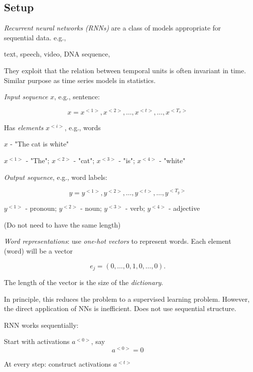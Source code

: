 \documentclass[english]{article}
\begin{document}
\subsection{Setup}
\benum
\item \emph{Recurrent neural networks (RNNs)} are a class of models appropriate for sequential data. e.g., 

text, speech, video, DNA sequence, 

They exploit that the relation between temporal units is often invariant in time. Similar purpose as time series models in statistics. 

\item 

\emph{Input sequence} $x$, e.g., sentence:  

$$x = x^{<1>}, x^{<2>}, \ldots, x^{<t>}, \ldots, x^{<T_x>}$$

Has \emph{elements} $x^{<i>}$, e.g., words

\benum 
\item 
$x$ - "The cat is white"
\item  $x^{<1>}$ - "The"; $x^{<2>}$ - "cat"; $x^{<3>}$ - "is"; $x^{<4>}$ - "white"
\eenum 

\emph{Output sequence}, e.g., word labels: 

$$y = y^{<1>}, y^{<2>}, \ldots, y^{<t>}, \ldots, y^{<T_y>}$$
\benum 
\item  $y^{<1>}$ - pronoun; $y^{<2>}$ - noun; $y^{<3>}$ - verb; $y^{<4>}$ - adjective
\eenum 


(Do not need to have the same length)


\item \emph{Word representations}: use \emph{one-hot vectors} to represent words. Each element (word) will be a vector 

$$e_j = (0,\ldots, 0, 1, 0,\ldots, 0).$$ 

The length of the vector is the size of the \emph{dictionary}.

In principle, this reduces the problem to a supervised learning problem. However, the direct application of NNs is inefficient. Does not use sequential structure. 

\item RNN works sequentially: 

\benum 
\item 
Start with activations $a^{<0>}$, say 
$$a^{<0>}=0$$
\item 
At every step: construct activations $a^{<t>}$
\end{document}
